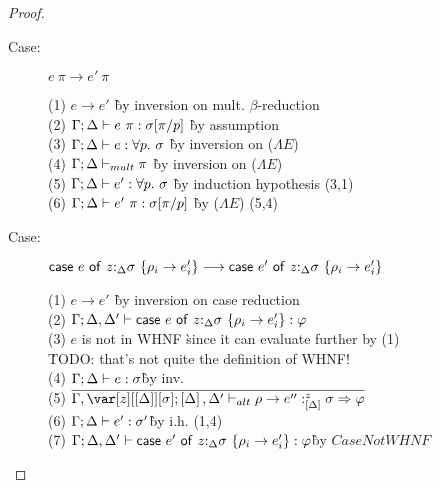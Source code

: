 \begin{proof}
\begin{description}
\item[Case:] $e~\pi \longrightarrow e'~\pi$
\begin{tabbing}
(1) $e \longrightarrow e'$ \` by inversion on mult. $\beta$-reduction \\
(2) $\Gamma; \Delta \vdash e~\pi : \sigma[\pi/p]$ \` by assumption \\
(3) $\Gamma; \Delta \vdash e : \forall p.~\sigma$ \` by inversion on ($\Lambda E$) \\
(4) $\Gamma; \Delta \vdash_{mult} \pi$ \` by inversion on ($\Lambda E$) \\
(5) $\Gamma; \Delta \vdash e' : \forall p.~\sigma$ \` by induction hypothesis (3,1) \\
(6) $\Gamma; \Delta \vdash e'~\pi : \sigma[\pi/p]$ \` by ($\Lambda E$) (5,4) \\
\end{tabbing}

\item[Case:] $\mathsf{case}~e~\mathsf{of}~z{:}_{\Delta}\sigma~\{\rho_i\to e'_i\} \longrightarrow \mathsf{case}~e'~\mathsf{of}~z{:}_{\Delta}\sigma~\{\rho_i\to e'_i\}$
\begin{tabbing}
    (1) $e \longrightarrow e'$ \` by inversion on case reduction \\
    (2) $\Gamma; \Delta, \Delta' \vdash \mathsf{case}~e~\mathsf{of}~z{:}_{\Delta}\sigma~\{\rho_i\to e'_i\} : \varphi$\\
    (3) $e$ is not in WHNF \` since it can evaluate further by (1)\\
    \` TODO: that's not quite the definition of WHNF!\\
    (4) $\Gamma;\Delta \vdash e : \sigma$\` by inv.\\
    (5) $\ov{\G,\z[\irr{\D}][\s]; \irr{\D},\D' \vdash_{alt} \rho \to e'' :^z_{\irr{\D}} \s \Rightarrow \vp}$\\
    (6) $\Gamma;\Delta \vdash e' : \sigma'$\` by i.h. (1,4)\\
    (7) $\Gamma; \Delta, \Delta' \vdash \mathsf{case}~e'~\mathsf{of}~z{:}_{\Delta}\sigma~\{\rho_i\to e'_i\} : \varphi$\` by $CaseNotWHNF$\\
\end{tabbing}

\end{description}

\end{proof}

